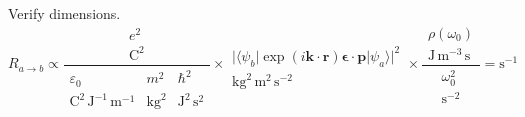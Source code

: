 Verify dimensions.
\begin{equation*}
R_{a\rightarrow b}\propto
\frac{\begin{matrix}
e^2
\\
\text{C}^2
\end{matrix}
}{\begin{matrix}
\varepsilon_0 & m^2 & \hbar^2
\\
\text{C}^2\,\text{J}^{-1}\,\text{m}^{-1}
& \text{kg}^2 & \text{J}^2\,\text{s}^2
\end{matrix}}
\times
\begin{matrix}
\\
\bigl|\langle\psi_b|\exp(i\mathbf k\cdot\mathbf r)\boldsymbol{\epsilon}\cdot\mathbf p|\psi_a\rangle\bigr|^2
\\
\text{kg}^2\,\text{m}^2\,\text{s}^{-2}
\end{matrix}
\times
\frac{
\begin{matrix}
\rho(\omega_0)
\\
\text{J}\,\text{m}^{-3}\,\text{s}
\end{matrix}
}{
\begin{matrix}
\omega_0^2
\\
\text{s}^{-2}
\end{matrix}
}
=\text{s}^{-1}
\end{equation*}


